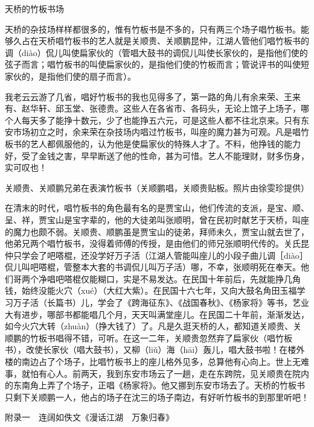 \documentclass[12pt,UTF8]{ctexbook}
\begin{document}
天桥的竹板书场


天桥的杂技场样样都很多的，惟有竹板书是不多的，只有两三个场子唱竹板书。能够久占在天桥唱竹板书的艺人就是关顺贵、关顺鹏昆仲，江湖人管他们唱竹板书的调（diào）侃儿叫使扁家伙的（管唱大鼓书的调侃儿叫使长家伙的，是指他们使的弦子而言；唱竹板书的叫使扁家伙的，是指他们使的竹板而言；管说评书的叫使短家伙的，是指他们使的扇子而言）。

我老云云游了几省，唱好竹板书的我也见得多了，第一路的角儿有余来荣、王来有、赵华轩、邱玉堂、张德贵。这些人在各省市、各码头，无论上馆子上场子，哪个人每天多了能挣十数元，少了也能挣五六元，可是这些人都不往北京来。只有东安市场初立之时，余来荣在杂技场内唱过竹板书，叫座的魔力甚为可观。凡是唱竹板书的艺人都佩服他的，认为他是使扁家伙的特殊人才了。不料，他挣钱的能力好，受了金钱之害，早早断送了他的性命，甚为可惜。艺人不能理财，财多伤身，实可叹也！

关顺贵、关顺鹏兄弟在表演竹板书（关顺鹏唱，关顺贵贴板。照片由徐雯珍提供）



在清末的时代，唱竹板书的角色最有名的是贾宝山，他们传流的支派，是宝、顺、呈、祥，贾宝山是宝字辈的，他的大徒弟叫张顺明，曾在民初时献艺于天桥，叫座的魔力也颇不弱。关顺贵、顺鹏虽是贾宝山的徒弟，拜师未久，贾宝山就去世了，他弟兄两个唱竹板书，没得着师傅的传授，是由他们的师兄张顺明代传的。关氏昆仲只学会了吧嗒棍，还没学好万子活（江湖人管能叫座儿的小段子曲儿调［diào］侃儿叫吧嗒棍，管整本大套的书调侃儿叫万子活）哪，不幸，张顺明死在奉天。他们哥两个净唱吧嗒棍仅能糊口，实是不易发达。在民国十年前后，先就能挣几角钱，始终没能火穴（xué）（大红大紫）。在民国十六七年，又向大鼓名角田玉福学习万子活（长篇书）儿，学会了《跨海征东》、《战国春秋》、《杨家将》等书，艺业大有进步，哪部书都能唱几个月，天天叫满堂座儿。在民国二十年前，渐渐发达，如今火穴大转（zhuàn）（挣大钱了）了。凡是久逛天桥的人，都知道关顺贵、关顺鹏的竹板书唱得不错，可听。在这一二年，关顺贵忽然弃了扁家伙（唱竹板书），改使长家伙（唱大鼓书），又柳（liǔ）海（hāi）轰儿，唱大鼓书啦！在楼外楼的南边占了个场子，比唱竹板书上的座儿格外见多，总算他有心向上。世上无难事，就怕有心人。前两天，我到东安市场云了一趟，走在东跨院，见关顺贵在院内的东南角上弄了个场子，正唱《杨家将》。他又挪到东安市场去了。天桥的竹板书只剩下关顺鹏一人，他占的场子在沈三的场子南边，有好听竹板书的到那里听吧！





附录一　连阔如佚文《漫话江湖　万象归春》
\end{document}
